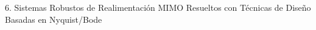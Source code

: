 6. Sistemas Robustos de Realimentación MIMO Resueltos con Técnicas de Diseño Basadas en Nyquist/Bode 
